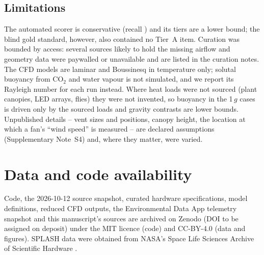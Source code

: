 \documentclass[11pt]{article}
\begin{document}
\subsection{Limitations}
The automated scorer is conservative (recall \hwValRecall{}) and its tiers are a lower bound; the blind gold
standard, however, also contained no Tier~A item. Curation was bounded by access: several sources likely to
hold the missing airflow and geometry data were paywalled or unavailable and are listed in the curation notes.
The CFD models are laminar and Boussinesq in temperature only; solutal buoyancy from CO$_2$ and water vapour
is not simulated, and we report its Rayleigh number for each run instead. Where heat loads were not sourced
(plant canopies, LED arrays, flies) they were not invented, so buoyancy in the 1\,$g$ cases is driven only by
the sourced loads and gravity contrasts are lower bounds. Unpublished details -- vent sizes and positions,
canopy height, the location at which a fan's ``wind speed'' is measured -- are declared assumptions
(Supplementary Note~S4) and, where they matter, were varied.

\section*{Data and code availability}
Code, the 2026-10-12 source snapshot, curated hardware specifications, model definitions, reduced CFD
outputs, the Environmental Data App telemetry snapshot and this manuscript's sources are archived on Zenodo (DOI to be assigned on deposit) under the
MIT licence (code) and CC-BY-4.0 (data and figures). SPLASH data were obtained from NASA's Space Life
Sciences Archive of Scientific Hardware \citep{splash}.



\end{document}

